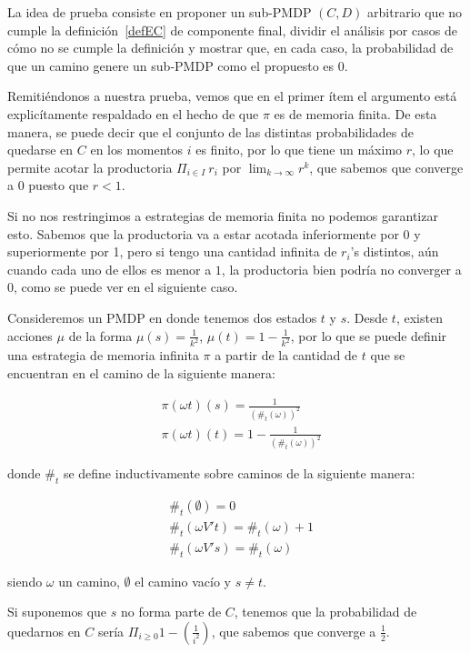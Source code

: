 La idea de prueba consiste en proponer un sub-PMDP $(C, D)$ arbitrario que no
cumple la definición~\ref{defEC} de componente final, dividir el análisis por
casos de cómo no se cumple la definición y mostrar que, en cada caso, la
probabilidad de que un camino genere un sub-PMDP como el propuesto es 0.

Remitiéndonos a nuestra prueba, vemos que en el primer ítem el argumento está
explicítamente respaldado en el hecho de que $\pi$ es de memoria finita. De
esta manera, se puede decir que el conjunto de las distintas probabilidades de
quedarse en $C$ en los momentos $i$ es finito, por lo que tiene un máximo $r$,
lo que permite acotar la productoria $\Pi_{i \in I} \ r_i$ por $\lim_{k \to
		\infty} r^k$, que sabemos que converge a 0 puesto que $r < 1$.

Si no nos restringimos a estrategias de memoria finita no podemos garantizar
esto. Sabemos que la productoria va a estar acotada inferiormente por 0 y
superiormente por 1, pero si tengo una cantidad infinita de $r_i$'s distintos,
aún cuando cada uno de ellos es menor a $1$, la productoria bien podría no
converger a $0$, como se puede ver en el siguiente caso.

Consideremos un PMDP en donde tenemos dos estados $t$ y $s$. Desde $t$, existen
acciones $\mu$ de la forma $\mu(s) = \frac{1}{k^2}$, $\mu(t) = 1 -
	\frac{1}{k^2}$, por lo que se puede definir una estrategia de memoria infinita
$\pi$ a partir de la cantidad de $t$ que se encuentran en el camino de la
siguiente manera:

\begin{align*}
	&\pi(\omega t)(s) = \frac{1}{(\#_t(\omega))^2} \\
	&\pi(\omega t)(t) = 1- \frac{1}{(\#_t(\omega))^2}
\end{align*}

donde $\#_t$ se define inductivamente sobre caminos de la siguiente manera:

\begin{align*}
	&\#_t(\emptyset) = 0 \\
	&\#_t(\omega V' t) = \#_t(\omega) + 1 \\
	&\#_t(\omega V' s) = \#_t(\omega)
\end{align*}

siendo $\omega$ un camino, $\emptyset$ el camino vacío y $s \neq t$.

Si suponemos que $s$ no forma parte de $C$, tenemos que la probabilidad de
quedarnos en $C$ sería $\Pi_{i \geq 0} 1-(\frac{1}{i^2})$, que sabemos que
converge a $\frac{1}{2}$.

